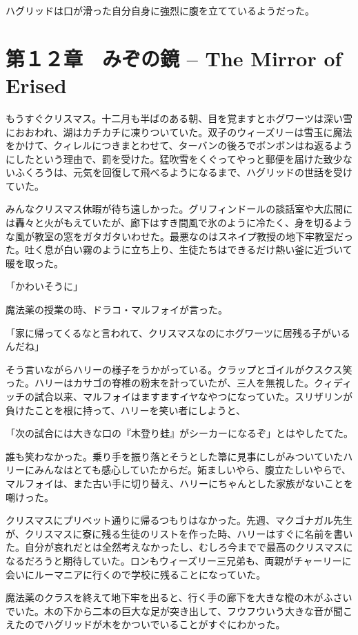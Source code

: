 \documentclass[10pt,a4paper]{article}
\begin{document}
\begin{CJK}{UTF8}{min}
ハグリッドは口が滑った自分自身に強烈に腹を立てているようだった。




\section{第１２章　みぞの鏡 -- The Mirror of Erised}





もうすぐクリスマス。十二月も半ばのある朝、目を覚ますとホグワーツは深い雪におおわれ、湖はカチカチに凍りついていた。双子のウィーズリーは雪玉に魔法をかけて、クィレルにつきまとわせて、ターバンの後ろでボンボンはね返るようにしたという理由で、罰を受けた。猛吹雪をくぐってやっと郵便を届けた致少ないふくろうは、元気を回復して飛べるようになるまで、ハグリッドの世話を受けていた。

みんなクリスマス休暇が待ち遠しかった。グリフィンドールの談話室や大広間には轟々と火がもえていたが、廊下はすき間風で氷のように冷たく、身を切るような風が教室の窓をガタガタいわせた。最悪なのはスネイプ教授の地下牢教室だった。吐く息が白い霧のように立ち上り、生徒たちはできるだけ熱い釜に近づいて暖を取った。

「かわいそうに」

魔法薬の授業の時、ドラコ・マルフォイが言った。

「家に帰ってくるなと言われて、クリスマスなのにホグワーツに居残る子がいるんだね」

そう言いながらハリーの様子をうかがっている。クラップとゴイルがクスクス笑った。ハリーはカサゴの脊椎の粉末を計っていたが、三人を無視した。クィディッチの試合以来、マルフォイはますますイヤなやつになっていた。スリザリンが負けたことを根に持って、ハリーを笑い者にしようと、

「次の試合には大きな口の『木登り蛙』がシーカーになるぞ」とはやしたてた。

誰も笑わなかった。乗り手を振り落とそうとした箒に見事にしがみついていたハリーにみんなはとても感心していたからだ。妬ましいやら、腹立たしいやらで、マルフォイは、また古い手に切り替え、ハリーにちゃんとした家族がないことを嘲けった。

クリスマスにプリベット通りに帰るつもりはなかった。先週、マクゴナガル先生が、クリスマスに寮に残る生徒のリストを作った時、ハリーはすぐに名前を書いた。自分が哀れだとは全然考えなかったし、むしろ今までで最高のクリスマスになるだろうと期待していた。ロンもウィーズリー三兄弟も、両親がチャーリーに会いにルーマニアに行くので学校に残ることになっていた。

魔法薬のクラスを終えて地下牢を出ると、行く手の廊下を大きな樅の木がふさいでいた。木の下から二本の巨大な足が突き出して、フウフウいう大きな音が聞こえたのでハグリッドが木をかついでいることがすぐにわかった。


\end{CJK}
\end{document}
